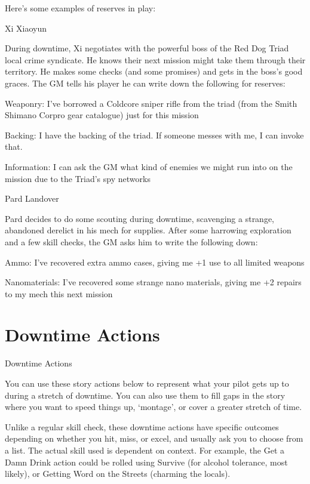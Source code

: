Here’s some examples of reserves in play:
 

Xi Xiaoyun  

During downtime, Xi negotiates with the powerful boss of the Red Dog Triad local crime  
syndicate. He knows their next mission might take them through their territory. He makes some  
checks (and some promises) and gets in the boss’s good graces. The GM tells his player he can  
write down the following for reserves:
 
	        Weaponry: I’ve borrowed a Coldcore sniper rifle from the triad (from the Smith Shimano  
Corpro gear catalogue) just for this mission
 
	        Backing: I have the backing of the triad. If someone messes with me, I can invoke that.
 
	        Information: I can ask the GM what kind of enemies we might run into on the mission  
due to the Triad’s spy networks
 

Pard Landover  

Pard decides to do some scouting during downtime, scavenging a strange, abandoned derelict  
in his mech for supplies. After some harrowing exploration and a few skill checks, the GM asks  
him to write the following down:
 
	        Ammo: I’ve recovered extra ammo cases, giving me +1 use to all limited weapons
 
	        Nanomaterials: I’ve recovered some strange nano materials, giving me +2 repairs to my  
mech this next mission  

                                                                                                                 

\section{Downtime Actions}

                                           Downtime Actions
 

You can use these story actions below to represent what your pilot gets up to during a stretch of  
downtime. You can also use them to fill gaps in the story where you want to speed things up,  
‘montage’, or cover a greater stretch of time.
 

Unlike a regular skill check, these downtime actions have specific outcomes depending on  
whether you hit, miss, or excel, and usually ask you to choose from a list. The actual skill used is  
dependent on context. For example, the Get a Damn Drink action could be rolled using Survive  
(for alcohol tolerance, most likely), or Getting Word on the Streets (charming the locals).
 

